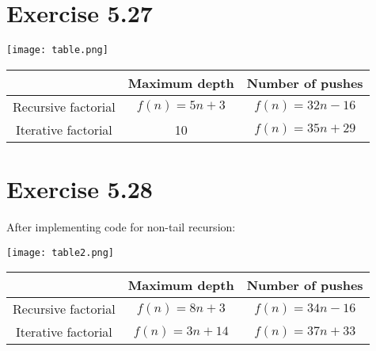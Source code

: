 \documentclass[a4paper,12pt]{article}
\begin{document}
\section{Exercise 5.27}
\begin{center}
\texttt{[image: table.png]}
\end{center}

\begin{center}
\begin{tabular}{ c | c | c }
  & Maximum depth & Number of pushes \\
	\hline
	\hline
 Recursive factorial & $f(n) = 5n + 3$ & $f(n) = 32n-16$ \\
 \hline
 Iterative factorial & 10 & $f(n) = 35n + 29$
\end{tabular}
\end{center}


\section{Exercise 5.28}
After implementing code for non-tail recursion:
\begin{center}
\texttt{[image: table2.png]}
\end{center}

\begin{center}
\begin{tabular}{ c | c | c }
  & Maximum depth & Number of pushes \\
	\hline
	\hline
 Recursive factorial & $f(n) = 8n + 3$ & $f(n) = 34n-16$ \\
 \hline
 Iterative factorial & $f(n) = 3n + 14$ & $f(n) = 37n + 33$
\end{tabular}
\end{center}

%

%
\end{document}
